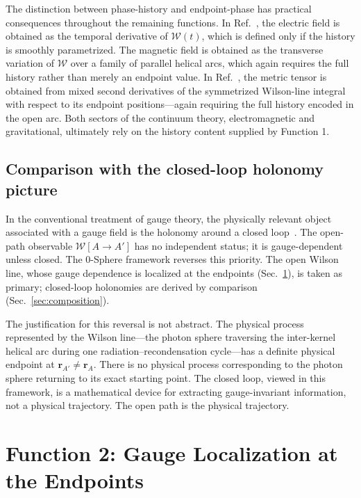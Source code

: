 \documentclass[%
 reprint, amsmath,amssymb, aps, prb, ]{revtex4-2}
\numberwithin{equation}{section}
\newcommand{\WL}{\mathcal{W}}
\begin{document}
The distinction between phase-history and endpoint-phase has practical consequences throughout the remaining functions. In Ref.~\cite{hanamura54}, the electric field is obtained as the temporal derivative of $\WL(t)$, which is defined only if the history is smoothly parametrized. The magnetic field is obtained as the transverse variation of $\WL$ over a family of parallel helical arcs, which again requires the full history rather than merely an endpoint value. In Ref.~\cite{hanamura51}, the metric tensor is obtained from mixed second derivatives of the symmetrized Wilson-line integral with respect to its endpoint positions---again requiring the full history encoded in the open arc. Both sectors of the continuum theory, electromagnetic and gravitational, ultimately rely on the history content supplied by Function 1.

\subsection{Comparison with the closed-loop holonomy picture}

In the conventional treatment of gauge theory, the physically relevant object associated with a gauge field is the holonomy around a closed loop~\cite{WuYang1975, Nakahara2003}. The open-path observable $\WL[A\to A']$ has no independent status; it is gauge-dependent unless closed. The 0-Sphere framework reverses this priority. The open Wilson line, whose gauge dependence is localized at the endpoints (Sec.~\ref{sec:gauge}), is taken as primary; closed-loop holonomies are derived by comparison (Sec.~\ref{sec:composition}).

The justification for this reversal is not abstract. The physical process represented by the Wilson line---the photon sphere traversing the inter-kernel helical arc during one radiation--recondensation cycle---has a definite physical endpoint at $\mathbf{r}_{A'} \neq \mathbf{r}_A$. There is no physical process corresponding to the photon sphere returning to its exact starting point. The closed loop, viewed in this framework, is a mathematical device for extracting gauge-invariant information, not a physical trajectory. The open path is the physical trajectory.

\section{Function 2: Gauge Localization at the Endpoints}
\label{sec:gauge}
\end{document}
